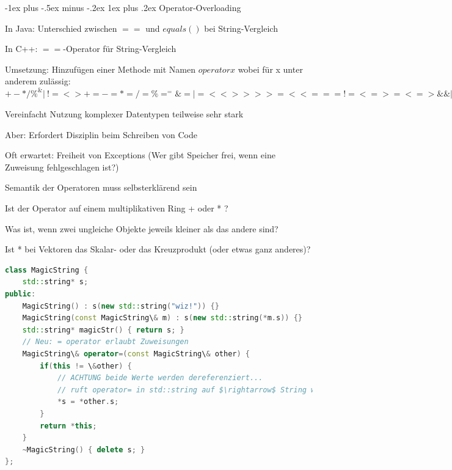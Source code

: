 \documentclass[10pt]{article}
\makeatletter
\renewcommand{\subsubsection}{\@startsection{subsubsection}{3}{0mm}%
                                {-1ex plus -.5ex minus -.2ex}%
                                {1ex plus .2ex}%
                                {\normalfont\small\bfseries}}
\makeatother
\begin{document}
\subsubsection{Operator-Overloading}
\begin{itemize*}
  \item In Java: Unterschied zwischen $==$ und $equals()$ bei String-Vergleich
  \item In C++: $==$-Operator für String-Vergleich
  \item Umsetzung: Hinzufügen einer Methode mit Namen $operator x$ wobei für x unter anderem zulässig: $+ - * / \% ^ \& | ~ ! = < > += -= *= /= \%= ^= \&= |= << >> >>= <<= == != <= >= <=> \&\& || ++ -- , ->* -> () []$
  \item Vereinfacht Nutzung komplexer Datentypen teilweise sehr stark
  \item Aber: Erfordert Disziplin beim Schreiben von Code
  \begin{itemize*}
    \item Oft erwartet: Freiheit von Exceptions (Wer gibt Speicher frei, wenn eine Zuweisung fehlgeschlagen ist?)
    \item Semantik der Operatoren muss selbsterklärend sein
    \begin{itemize*}
      \item Ist der Operator auf einem multiplikativen Ring + oder * ?
      \item Was ist, wenn zwei ungleiche Objekte jeweils kleiner als das andere sind?
      \item Ist * bei Vektoren das Skalar- oder das Kreuzprodukt (oder etwas ganz anderes)?
    \end{itemize*}
  \end{itemize*}
\end{itemize*}

\begin{lstlisting}[language=C++]
class MagicString {
    std::string* s;
public:
    MagicString() : s(new std::string("wiz!")) {}
    MagicString(const MagicString\& m) : s(new std::string(*m.s)) {}
    std::string* magicStr() { return s; }
    // Neu: = operator erlaubt Zuweisungen
    MagicString\& operator=(const MagicString\& other) {
        if(this != \&other) {
            // ACHTUNG beide Werte werden dereferenziert...
            // ruft operator= in std::string auf $\rightarrow$ String wird kopiert
            *s = *other.s;
        }
        return *this;
    }
    ~MagicString() { delete s; }
};
\end{lstlisting}
\end{document}
